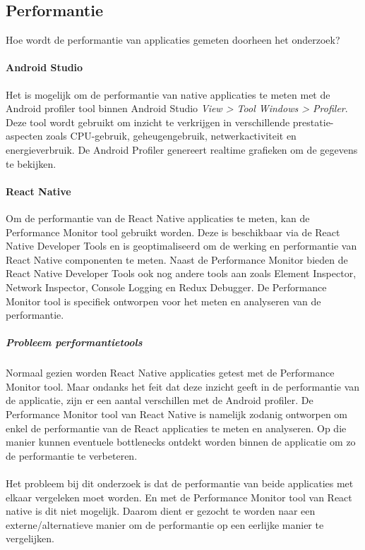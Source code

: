 \subsection{Performantie}
Hoe wordt de performantie van applicaties gemeten doorheen het onderzoek?

\paragraph{Android Studio}
Het is mogelijk om de performantie van native applicaties te meten met de Android profiler tool 
binnen Android Studio \textit{View > Tool Windows > Profiler}. Deze tool wordt gebruikt om 
inzicht te verkrijgen 
in verschillende prestatie-aspecten zoals CPU-gebruik, geheugengebruik, netwerkactiviteit en 
energieverbruik. De Android Profiler genereert realtime grafieken om de gegevens te bekijken. 

\paragraph{React Native}
Om de performantie van de React Native applicaties te meten, kan de Performance 
Monitor tool gebruikt worden. Deze is beschikbaar via de React Native Developer 
Tools en is geoptimaliseerd om de werking en performantie van React Native 
componenten te meten. Naast de Performance Monitor bieden de React Native Developer 
Tools ook nog andere tools aan zoals Element Inspector, Network Inspector, Console 
Logging en Redux Debugger. De Performance Monitor tool is specifiek ontworpen 
voor het meten en analyseren van de performantie.

\subparagraph{Probleem performantietools}
Normaal gezien worden React Native applicaties getest met de Performance Monitor tool.
Maar ondanks het feit dat deze inzicht geeft in de performantie van de applicatie, 
zijn er een aantal verschillen met de Android profiler. De Performance Monitor tool 
van React Native is namelijk zodanig ontworpen om enkel de performantie van de 
React applicaties te meten en analyseren. Op die manier kunnen eventuele 
\gls{bottlenecks} ontdekt worden binnen de applicatie om zo de performantie te verbeteren.
\\\\
Het probleem bij dit onderzoek is dat de performantie van beide applicaties met 
elkaar vergeleken moet worden. En met de Performance Monitor tool van React 
native is dit niet mogelijk. Daarom dient er gezocht te worden naar een externe/alternatieve 
manier om de performantie op een eerlijke manier te vergelijken.

